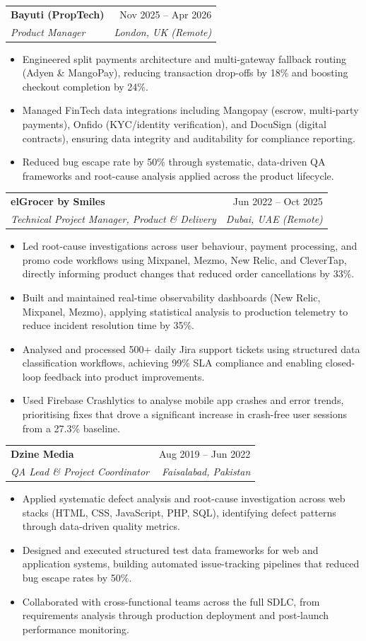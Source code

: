 \documentclass[letterpaper,10pt]{article}
\makeatletter
\newcommand{\resumeItem}[1]{
  \item\small{
    {#1 \vspace{-2pt}}
  }
}
\newcommand{\resumeSubheading}[4]{
  \vspace{-2pt}\item
    \begin{tabular*}{0.97\textwidth}[t]{l@{\extracolsep{\fill}}r}
      \textbf{#1} & #2 \\
      \textit{\small#3} & \textit{\small #4} \\
    \end{tabular*}\vspace{-7pt}
}
\newcommand{\resumeItemListStart}{\begin{itemize}[leftmargin=0.15in]}
\newcommand{\resumeItemListEnd}{\end{itemize}\vspace{-5pt}}
\makeatother
\begin{document}
    \resumeSubheading
      {Bayuti (PropTech)}{Nov 2025 – Apr 2026}
      {Product Manager}{London, UK (Remote)}
      \resumeItemListStart
        \resumeItem{Engineered split payments architecture and multi-gateway fallback routing (Adyen \& MangoPay), reducing transaction drop-offs by 18\% and boosting checkout completion by 24\%.}
        \resumeItem{Managed FinTech data integrations including Mangopay (escrow, multi-party payments), Onfido (KYC/identity verification), and DocuSign (digital contracts), ensuring data integrity and auditability for compliance reporting.}
        \resumeItem{Reduced bug escape rate by 50\% through systematic, data-driven QA frameworks and root-cause analysis applied across the product lifecycle.}
      \resumeItemListEnd

    \resumeSubheading
      {elGrocer by Smiles}{Jun 2022 – Oct 2025}
      {Technical Project Manager, Product \& Delivery}{Dubai, UAE (Remote)}
      \resumeItemListStart
        \resumeItem{Led root-cause investigations across user behaviour, payment processing, and promo code workflows using Mixpanel, Mezmo, New Relic, and CleverTap, directly informing product changes that reduced order cancellations by 33\%.}
        \resumeItem{Built and maintained real-time observability dashboards (New Relic, Mixpanel, Mezmo), applying statistical analysis to production telemetry to reduce incident resolution time by 35\%.}
        \resumeItem{Analysed and processed 500+ daily Jira support tickets using structured data classification workflows, achieving 99\% SLA compliance and enabling closed-loop feedback into product improvements.}
        \resumeItem{Used Firebase Crashlytics to analyse mobile app crashes and error trends, prioritising fixes that drove a significant increase in crash-free user sessions from a 27.3\% baseline.}
      \resumeItemListEnd

    \resumeSubheading
      {Dzine Media}{Aug 2019 – Jun 2022}
      {QA Lead \& Project Coordinator}{Faisalabad, Pakistan}
      \resumeItemListStart
        \resumeItem{Applied systematic defect analysis and root-cause investigation across web stacks (HTML, CSS, JavaScript, PHP, SQL), identifying defect patterns through data-driven quality metrics.}
        \resumeItem{Designed and executed structured test data frameworks for web and application systems, building automated issue-tracking pipelines that reduced bug escape rates by 50\%.}
        \resumeItem{Collaborated with cross-functional teams across the full SDLC, from requirements analysis through production deployment and post-launch performance monitoring.}
      \resumeItemListEnd
\end{document}
